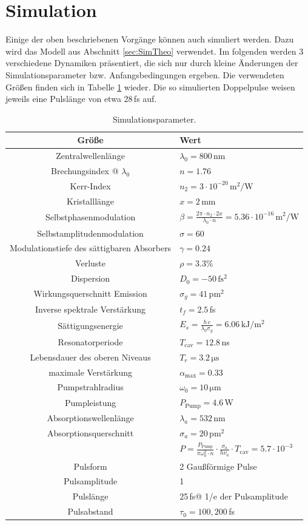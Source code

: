 \documentclass[bachelor,       %
               twoside,        %
               BCOR10mm,       %
               liststotoc,nomtotoc,bibtotoc, %
               english,ngerman, %
               final,          %
               ]{GAUBM}
\begin{document}
\section{Simulation}
Einige der oben beschriebenen Vorgänge können auch simuliert werden.
Dazu wird das Modell aus Abschnitt \ref{sec:SimTheo} verwendet.
Im folgenden werden 3 verschiedene Dynamiken präsentiert, die sich nur durch kleine Änderungen der Simulationsparameter bzw. Anfangsbedingungen ergeben.
Die verwendeten Größen finden sich in Tabelle \ref{tab:SimParam} wieder.
Die so simulierten Doppelpulse weisen jeweils eine Pulslänge von etwa 28\,fs auf.
\begin{table}[!htb]
	\centering
	\begin{tabular}{|c|l|}
		\hline
		Größe & Wert\\
		\hline
		Zentralwellenlänge & $\lambda_0=800\,$nm\\	
		Brechungsindex @ $\lambda_0$ & $n=1.76$\\
		Kerr-Index & $n_2=3\cdot 10^{-20}\,\si{\meter^2\per\watt}$\\
		Kristalllänge & $x=2\,$mm\\
		Selbstphasenmodulation & $\beta=\frac{2\pi\cdot n_2\cdot 2x}{\lambda_0\cdot n}=5.36\cdot 10^{-16}\,\si{\meter^2\per\watt}$\\
		Selbstamplitudenmodulation & $\sigma=60$\\
		Modulationstiefe des sättigbaren Absorbers & $\gamma=0.24$\\
		Verluste & $\rho=3.3\%$\\
		Dispersion & $D_0=-50\,\si{\femto\second^2}$\\
		Wirkungsquerschnitt Emission & $\sigma_g=41\,\si{\pico\meter^2}$\\
		Inverse spektrale Verstärkung & $t_f=2.5\,$fs\\	
		Sättigungsenergie & $E_s=\frac{h\,c}{\lambda_0\sigma_g}= 6.06\,\si{\kilo\joule\per\meter^2}$\\
		Resonatorperiode & $T_\text{cav}=12.8\,$ns\\
		Lebensdauer des oberen Niveaus & $T_r=3.2\,\si{\micro\second}$\\
		maximale Verstärkung & $\alpha_\text{max}=0.33$\\
		Pumpstrahlradius & $\omega_0=10\,\si{\micro\meter}$\\
		Pumpleistung & $P_\text{Pump}=4.6\,$W\\
		Absorptionswellenlänge & $\lambda_a=532\,$nm\\
		Absorptionsquerschnitt & $\sigma_a=20\,\si{\pico\meter^2}$\\
		& $P=\frac{P_\text{Pump}}{\pi\omega_0^2\cdot n}\cdot\frac{\sigma_a}{h\nu_a}\cdot T_\text{cav}=5.7\cdot 10^{-3}$\\
		\hline		
		Pulsform & 2 Gaußförmige Pulse\\
		Pulsamplitude & 1\\
		Pulslänge & 25\,fs\quad @ 1/e der Pulsamplitude\\
		Pulsabstand & $\tau_0=100,200\,$fs\\
		\hline
	\end{tabular}
	\caption{Simulationsparameter.}
	\label{tab:SimParam}
\end{table}
\end{document}
